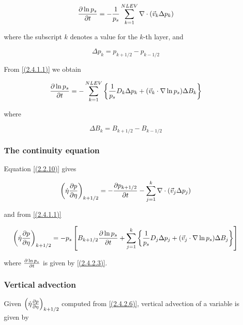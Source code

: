\begin{equation}
\frac {\partial \ln{p_s}} {\partial t} = -\frac{1}{p_s}\sum\limits^{NLEV}_{k=1}
\nabla \cdot (\vec{v}_k\Delta p_k)
\label{(2.4.2.1)}
\end{equation}

where the subscript $k$ denotes a value for the $k$-th layer, and

\begin{equation}
\Delta p_k = p_{k+1/2}-p_{k-1/2}
\label{(2.4.2.2)}
\end{equation}

From \ref{(2.4.1.1)} we obtain

\begin{equation}
\frac {\partial \ln{p_s}} {\partial t} = -\sum\limits^{NLEV}_{k=1}\left\{\frac{1}{p_s} D_k\Delta p_k
+ (\vec{v}_k \cdot \nabla \ln p_s) \Delta B_k\right\}
\label{(2.4.2.3)}
\end{equation}

   where

\begin{equation}
\Delta B_k = B_{k+1/2}-B_{k-1/2}
\label{(2.4.2.4)}
\end{equation}

\subsubsection{The continuity equation}

Equation \ref{(2.2.10)} gives

\begin{equation}
\left(\dot{\eta}\frac {\partial p} {\partial \eta}\right)_{k+1/2} = -\frac {\partial p_{k+1/2}} {\partial t} 
-\sum\limits^{k}_{j=1}\nabla \cdot (\vec{v}_j \Delta p_j)
\label{(2.4.2.5)}
\end{equation}

 and from \ref{(2.4.1.1)}

\begin{equation}
\left(\dot{\eta}\frac {\partial p} {\partial \eta}\right)_{k+1/2} = -p_s\left[B_{k+1/2}\frac {\partial \ln{p_s}} {\partial t}
+ \sum\limits^{k}_{j=1} \left\{\frac{1}{p_s} D_j\Delta p_j
+ (\vec{v}_j \cdot \nabla \ln p_s) \Delta B_j\right\}\right]
\label{(2.4.2.6)}
\end{equation}

where $\frac {\partial \ln{p_s}} {\partial t}$ is given by \ref{(2.4.2.3)}.

\subsubsection{Vertical advection}

Given $\left(\dot{\eta}\frac {\partial p} {\partial \eta}\right)_{k+1/2}$ computed from
\ref{(2.4.2.6)}, vertical advection of a variable is given by

